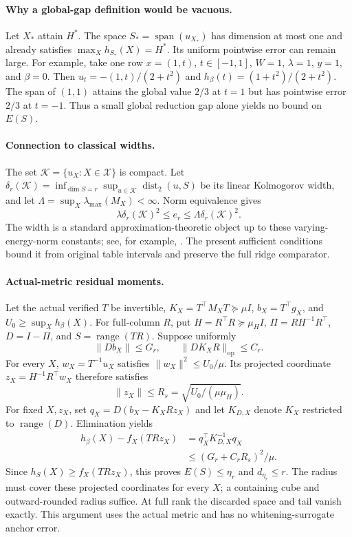 \paragraph{Why a global-gap definition would be vacuous.}
Let $X_*$ attain $H^*$. The space $S_* =\operatorname{span}(u_{X_*})$ has dimension at most one and already satisfies $\max_Xh_{S_*}(X)=H^*$. Its uniform pointwise error can remain large. For example, take one row $x=(1,t)$, $t\in[-1,1]$, $W=1$, $\lambda=1$, $y=1$, and $\beta=0$. Then $u_t=-(1,t)/(2+t^2)$ and $h_\beta(t)=(1+t^2)/(2+t^2)$. The span of $(1,1)$ attains the global value $2/3$ at $t=1$ but has pointwise error $2/3$ at $t=-1$. Thus a small global reduction gap alone yields no bound on $E(S)$.

\paragraph{Connection to classical widths.}
The set $\mathcal K=\{u_X:X\in\mathcal X\}$ is compact. Let $\delta_r(\mathcal K)=\inf_{\dim S=r}\sup_{u\in\mathcal K}\operatorname{dist}_2(u,S)$ be its linear Kolmogorov width, and let $\Lambda=\sup_X\lambda_{\max}(M_X)<\infty$. Norm equivalence gives
\[
 \lambda\delta_r(\mathcal K)^2\leq e_r\leq\Lambda\delta_r(\mathcal K)^2.
\]
The width is a standard approximation-theoretic object up to these varying-energy-norm constants; see, for example, \citet{binev2011}. The present sufficient conditions bound it from original table intervals and preserve the full ridge comparator.

\paragraph{Actual-metric residual moments.}
Let the actual verified $T$ be invertible, $K_X=T^\top M_XT\succeq\mu I$, $b_X=T^\top g_X$, and $U_0\geq\sup_Xh_\beta(X)$. For full-column $R$, put $H=R^\top R\succeq\mu_HI$, $\Pi=RH^{-1}R^\top$, $D=I-\Pi$, and $S=\operatorname{range}(TR)$. Suppose uniformly
\[
 \|Db_X\|\leq G_r,\qquad \|DK_XR\|_{\mathrm{op}}\leq C_r.
\]
For every $X$, $w_X=T^{-1}u_X$ satisfies $\|w_X\|^2\leq U_0/\mu$. Its projected coordinate $z_X=H^{-1}R^\top w_X$ therefore satisfies
\[
 \|z_X\|\leq R_s=\sqrt{U_0/(\mu\mu_H)}.
\]
For fixed $X,z_X$, set $q_X=D(b_X-K_XRz_X)$ and let $K_{D,X}$ denote $K_X$ restricted to $\operatorname{range}(D)$. Elimination yields
\begin{align*}
 h_\beta(X)-f_X(TRz_X)&=q_X^\top K_{D,X}^{-1}q_X\\
 &\leq (G_r+C_rR_s)^2/\mu.
\end{align*}
Since $h_S(X)\geq f_X(TRz_X)$, this proves $E(S)\leq\eta_r$ and $d_{\eta_r}\leq r$. The radius must cover these projected coordinates for every $X$; a containing cube and outward-rounded radius suffice. At full rank the discarded space and tail vanish exactly. This argument uses the actual metric and has no whitening-surrogate anchor error.

